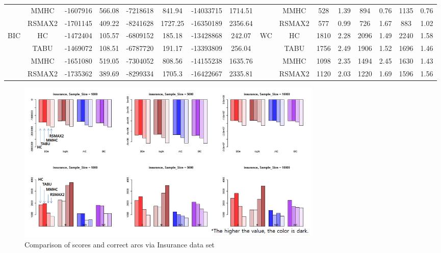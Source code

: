 \begin{table}[p]
{\begin{tabular}{cc||cc|cc|cc||cc|cc|cc|cc}
& MMHC &	-1607916 & 	566.08 & 	-7218618 & 	841.94 & 	-14033715 & 	1714.51 & 	& MMHC &	528 & 	1.39 & 	894 & 	0.76 & 	1135 & 	0.76\tabularnewline													
& RSMAX2 &	-1701145 & 	409.22 & 	-8241628 & 	1727.25 & 	-16350189 & 	2356.64 & 	& RSMAX2 &	577 & 	0.99 & 	726 & 	1.67 & 	883 & 	1.02\tabularnewline													
\hline																										
\multirow{4}{*}{BIC} & HC &	-1472404 & 	105.57 & 	-6809152 & 	185.18 & 	-13428868 & 	242.07 & 	\multirow{4}{*}{WC} & HC &	1810 & 	2.28 & 	2096 & 	1.49 & 	2240 & 	1.58\tabularnewline													
& TABU &	-1469072 & 	108.51 & 	-6787720 & 	191.17 & 	-13393809 & 	256.04 & 	& TABU &	1756 & 	2.49 & 	1906 & 	1.52 & 	1696 & 	1.46\tabularnewline													
& MMHC &	-1651080 & 	519.05 & 	-7304052 & 	808.56 & 	-14155238 & 	1635.76 & 	& MMHC &	1098 & 	2.35 & 	1494 & 	2.45 & 	1630 & 	1.43\tabularnewline													
& RSMAX2 &	-1735362 & 	389.69 & 	-8299334 & 	1705.3 & 	-16422667 & 	2335.81 & 	& RSMAX2 &	1120 & 	2.03 & 	1220 & 	1.69 & 	1596 & 	1.56\tabularnewline													
\hline																										
\end{tabular}																										
}																										
\end{table}

	\begin{figure}[p]
	\centering
		\includegraphics[height=220pt]{Real_2_Insurance}
		\caption{Comparison of scores and correct arcs via Insurance data set}
	\end{figure}	